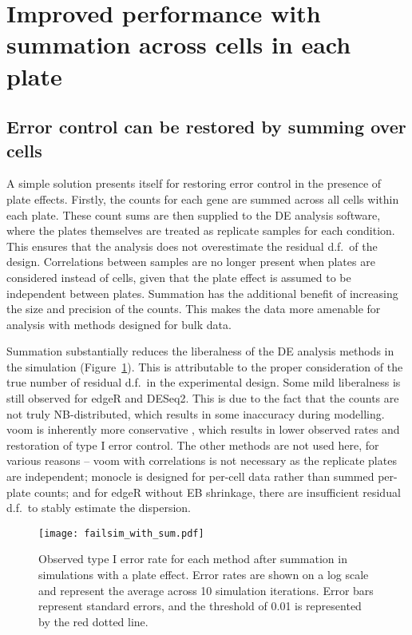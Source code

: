 \documentclass{article}
\begin{document}
\section{Improved performance with summation across cells in each plate}

\subsection{Error control can be restored by summing over cells}
A simple solution presents itself for restoring error control in the presence of plate effects.
Firstly, the counts for each gene are summed across all cells within each plate.
These count sums are then supplied to the DE analysis software, where the plates themselves are treated as replicate samples for each condition.
This ensures that the analysis does not overestimate the residual d.f.\ of the design.
Correlations between samples are no longer present when plates are considered instead of cells, given that the plate effect is assumed to be independent between plates.
Summation has the additional benefit of increasing the size and precision of the counts.
This makes the data more amenable for analysis with methods designed for bulk data.

Summation substantially reduces the liberalness of the DE analysis methods in the simulation (Figure~\ref{fig:platesum}).
This is attributable to the proper consideration of the true number of residual d.f.\ in the experimental design.
Some mild liberalness is still observed for edgeR and DESeq2.
This is due to the fact that the counts are not truly NB-distributed, which results in some inaccuracy during modelling.
voom is inherently more conservative \cite{law2014voom}, which results in lower observed rates and restoration of type I error control.
The other methods are not used here, for various reasons -- voom with correlations is not necessary as the replicate plates are independent;
    monocle is designed for per-cell data rather than summed per-plate counts;
    and for edgeR without EB shrinkage, there are insufficient residual d.f.\ to stably estimate the dispersion.

\begin{figure}[tbp]
\begin{center}
\texttt{[image: failsim\_with\_sum.pdf]}
\end{center}
\caption{
    Observed type I error rate for each method after summation in simulations with a plate effect.
    Error rates are shown on a log scale and represent the average across 10 simulation iterations.
    Error bars represent standard errors, and the threshold of 0.01 is represented by the red dotted line.
}
\label{fig:platesum}
\end{figure}
\end{document}
